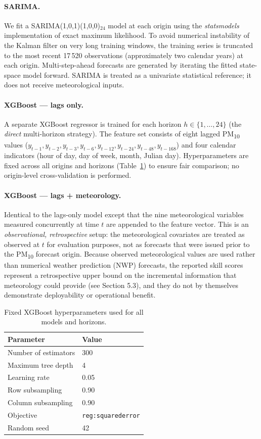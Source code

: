 \documentclass[12pt,a4paper]{article}
\newcommand{\PMten}{PM\textsubscript{10}}
\begin{document}
\paragraph{SARIMA.}
We fit a SARIMA(1,0,1)(1,0,0)$_{24}$ model at each origin using the
\textit{statsmodels} implementation of exact maximum likelihood.  To avoid
numerical instability of the Kalman filter on very long training windows, the
training series is truncated to the most recent 17\,520 observations
(approximately two calendar years) at each origin.  Multi-step-ahead forecasts
are generated by iterating the fitted state-space model forward.  SARIMA is
treated as a univariate statistical reference; it does not receive
meteorological inputs.

\paragraph{XGBoost — lags only.}
A separate XGBoost regressor \citep{Chen2016} is trained for each horizon
$h \in \{1, \ldots, 24\}$ (the \emph{direct} multi-horizon strategy).  The
feature set consists of eight lagged \PMten{} values
($y_{t-1}, y_{t-2}, y_{t-3}, y_{t-6}, y_{t-12}, y_{t-24}, y_{t-48},
y_{t-168}$) and four calendar indicators (hour of day, day of week, month,
Julian day).  Hyperparameters are fixed across all origins and horizons
(Table~\ref{tab:xgb_params}) to ensure fair comparison; no origin-level
cross-validation is performed.

\paragraph{XGBoost — lags + meteorology.}
Identical to the lags-only model except that the nine meteorological variables
measured concurrently at time $t$ are appended to the feature vector.  This is
an \emph{observational, retrospective} setup: the meteorological covariates are
treated as observed at $t$ for evaluation purposes, not as forecasts that were
issued prior to the \PMten{} forecast origin.  Because observed meteorological
values are used rather than numerical weather prediction (NWP) forecasts, the
reported skill scores represent a retrospective upper bound on the incremental
information that meteorology could provide (see Section 5.3), and they do not
by themselves demonstrate deployability or operational benefit.

\begin{table}[htbp]
\centering
\caption{Fixed XGBoost hyperparameters used for all models and horizons.}
\label{tab:xgb_params}
\begin{tabular}{ll}
\toprule
Parameter & Value \\
\midrule
Number of estimators & 300 \\
Maximum tree depth & 4 \\
Learning rate & 0.05 \\
Row subsampling & 0.90 \\
Column subsampling & 0.90 \\
Objective & \texttt{reg:squarederror} \\
Random seed & 42 \\
\bottomrule
\end{tabular}
\end{table}
\end{document}
